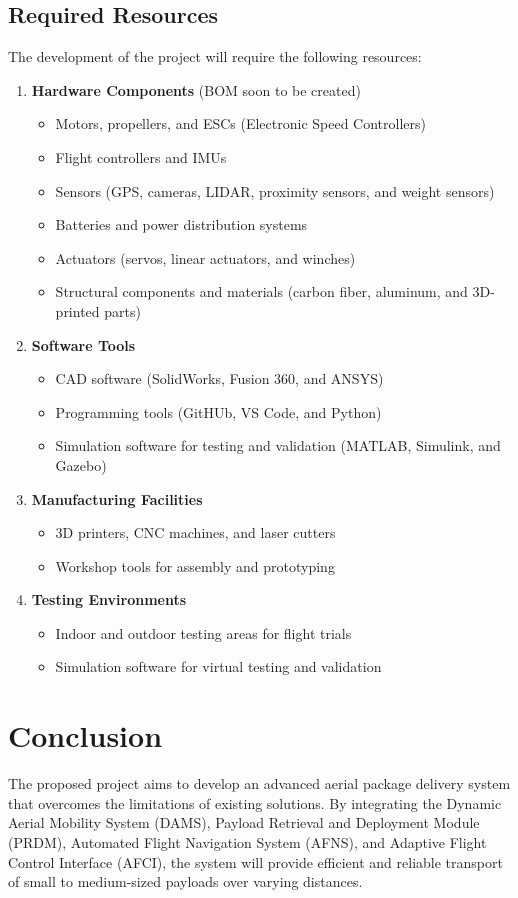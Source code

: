 \documentclass[12pt]{article}
\begin{document}
\subsection{Required Resources}
The development of the project will require the following resources:
\begin{enumerate}
    \item \textbf{Hardware Components} (BOM soon to be created) 
    \begin{itemize}
        \item Motors, propellers, and ESCs (Electronic Speed Controllers)
        \item Flight controllers and IMUs
        \item Sensors (GPS, cameras, LIDAR, proximity sensors, and weight sensors)
        \item Batteries and power distribution systems
        \item Actuators (servos, linear actuators, and winches)
        \item Structural components and materials (carbon fiber, aluminum, and 3D-printed parts)
    \end{itemize}
    \item \textbf{Software Tools}
    \begin{itemize}
        \item CAD software (SolidWorks, Fusion 360, and ANSYS)
        \item Programming tools (GitHUb, VS Code, and Python)
        \item Simulation software for testing and validation (MATLAB, Simulink, and Gazebo)
    \end{itemize}
    \item \textbf{Manufacturing Facilities}
    \begin{itemize}
        \item 3D printers, CNC machines, and laser cutters
        \item Workshop tools for assembly and prototyping
    \end{itemize}
    \item \textbf{Testing Environments}
    \begin{itemize}
        \item Indoor and outdoor testing areas for flight trials
        \item Simulation software for virtual testing and validation
    \end{itemize}
\end{enumerate}

\section{Conclusion}
The proposed project aims to develop an advanced aerial package delivery system that overcomes the limitations of existing solutions. By integrating the Dynamic Aerial Mobility System (DAMS), Payload Retrieval and Deployment Module (PRDM), Automated Flight Navigation System (AFNS), and Adaptive Flight Control Interface (AFCI), the system will provide efficient and reliable transport of small to medium-sized payloads over varying distances.
\end{document}
